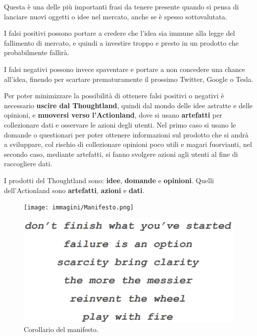 Questa è una delle più importanti frasi da tenere presente quando si pensa di lanciare nuovi oggetti o idee nel mercato, anche se è spesso sottovalutata.

I falsi positivi possono portare a credere che l'idea sia immune alla legge del fallimento di mercato, e quindi a investire troppo e presto in un prodotto
che probabilmente fallirà.

I falsi negativi possono invece spaventare e portare a non concedere una chance all'idea, finendo per scartare prematuramente il prossimo Twitter, Google o
Tesla.

Per poter minimizzare la possibilità di ottenere falsi positivi o negativi è necessario \textbf{uscire dal Thoughtland}, quindi dal mondo delle idee
astratte e delle opinioni, e \textbf{muoversi verso l'Actionland}, dove si usano \textbf{artefatti} per collezionare dati e osservare le azioni degli
utenti. Nel primo caso si usano le domande o questionari per poter ottenere informazioni sul prodotto che si andrà a sviluppare, col rischio di collezionare
opinioni poco utili e magari fuorvianti, nel secondo caso, mediante artefatti, si fanno svolgere azioni agli utenti al fine di raccogliere dati.

I prodotti del Thoughtland sono: \textbf{idee}, \textbf{domande} e \textbf{opinioni}. Quelli dell'Actionland sono \textbf{artefatti}, \textbf{azioni} e
\textbf{dati}.

\pagebreak

\begin{figure}[!h]
	\centering
	\texttt{[image: immagini/Manifesto.png]}
\end{figure}

\begin{figure}[!h]
	\centering
	\includegraphics[scale=0.25]{immagini/pretotyping-manifesto-corollario.png}
	\caption{Corollario del manifesto.}
\end{figure}

